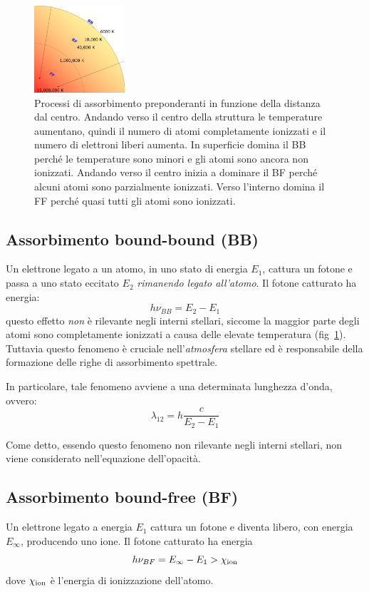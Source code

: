 \begin{figure}
\centering
\includegraphics[width=0.3\textwidth]{immagini/assorbimenti-stella.png}
\caption{Processi di assorbimento preponderanti in funzione della distanza dal centro. Andando verso il centro della struttura le temperature aumentano, quindi il numero di atomi completamente ionizzati e il numero di elettroni liberi aumenta. In superficie domina il BB perché le temperature sono minori e gli atomi sono ancora non ionizzati. Andando verso il centro inizia a dominare il BF perché alcuni atomi sono parzialmente ionizzati. Verso l'interno domina il FF perché quasi tutti gli atomi sono ionizzati.}
\label{fig:assorbimenti-stella}
\end{figure}

\subsection{Assorbimento bound-bound (BB)}\label{sec:bound-bound}
Un elettrone legato a un atomo, in uno stato di energia $E_1$, cattura un fotone e passa a uno stato eccitato $E_2$ \emph{rimanendo legato all'atomo}. Il fotone catturato ha energia:
\begin{equation}
    h \nu_{BB} = E_2 - E_1
\end{equation}
questo effetto \emph{non} è rilevante negli interni stellari, siccome la maggior parte degli atomi sono completamente ionizzati a causa delle elevate temperatura (fig~\ref{fig:assorbimenti-stella}). Tuttavia questo fenomeno è cruciale nell'\emph{atmosfera} stellare ed è responsabile della formazione delle righe di assorbimento spettrale.

In particolare, tale fenomeno avviene a una determinata lunghezza d'onda, ovvero:
\begin{equation}\label{eq:lunghezza-BB}
    \lambda_{12} = h \dfrac{c}{E_2 - E_1}
\end{equation}

Come detto, essendo questo fenomeno non rilevante negli interni stellari, non viene considerato nell'equazione dell'opacità.

\subsection{Assorbimento bound-free (BF)}\label{sec:bound-free}
Un elettrone legato a energia $E_1$ cattura un fotone e diventa libero, con energia $E_\infty$, producendo uno ione. Il fotone catturato ha energia
\begin{equation}
    h \nu_{BF} = E_\infty - E_1 > \chi_\textup{ion}
\end{equation}
dove $\chi_\textup{ion}$ è l'energia di ionizzazione dell'atomo. 

